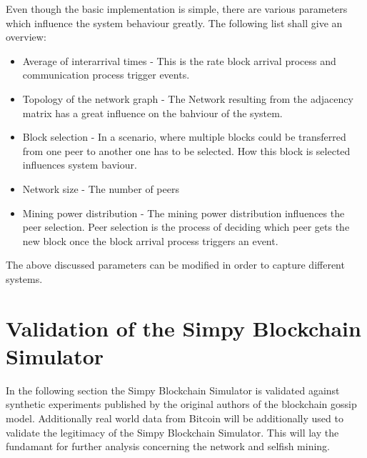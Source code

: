 Even though the basic implementation is simple, there are various parameters which influence the system behaviour greatly. The following list shall give an overview:
\begin{itemize}
\item Average of interarrival times - This is the rate block arrival process and communication process trigger events. 
\item Topology of the network graph - The Network resulting from the adjacency matrix has a great influence on the bahviour of the system.
\item Block selection - In a scenario, where multiple blocks could be transferred from one peer to another one has to be selected. How this block is selected influences system baviour.
\item Network size - The number of peers
\item Mining power distribution - The mining power distribution influences the peer selection. Peer selection is the process of deciding which peer gets the new block once the block arrival process triggers an event.
\end{itemize}
The above discussed parameters can be modified in order to capture different systems.

\section{Validation of the Simpy Blockchain Simulator}
In the following section the Simpy Blockchain Simulator is validated against synthetic experiments published by the original authors of the blockchain gossip model. Additionally real world data from Bitcoin will be additionally used to validate the legitimacy of the Simpy Blockchain Simulator. This will lay the fundamant for further analysis concerning the network and selfish mining. 
